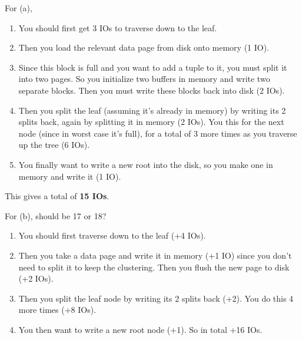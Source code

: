 \begin{example}
    For (a), 
    \begin{enumerate}
      \item You should first get 3 IOs to traverse down to the leaf. 
      \item Then you load the relevant data page from disk onto memory (1 IO). 
      \item Since this block is full and you want to add a tuple to it, you must split it into two pages. So you initialize two buffers in memory and write two separate blocks. Then you must write these blocks back into disk (2 IOs). 
      \item Then you split the leaf (assuming it's already in memory) by writing its 2 splits back, again by splitting it in memory (2 IOs). You this for the next node (since in worst case it's full), for a total of 3 more times as you traverse up the tree (6 IOs). 
      \item You finally want to write a new root into the disk, so you make one in memory and write it (1 IO). 
    \end{enumerate}
    This gives a total of \textbf{15 IOs}. 

    For (b), should be 17 or 18? 
    \begin{enumerate}
      \item You should first traverse down to the leaf (+4 IOs). 
      \item Then you take a data page and write it in memory (+1 IO) since you don't need to split it to keep the clustering. Then you flush the new page to disk (+2 IOs). 
      \item Then you split the leaf node by writing its 2 splits back (+2). You do this 4 more times (+8 IOs). 
      \item You then want to write a new root node (+1). So in total +16 IOs. 
    \end{enumerate}
  \end{example}

